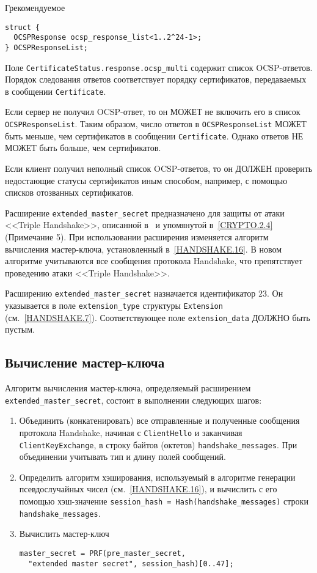 \begin{appendix}{Г}{рекомендуемое}
\begin{lstlisting}
struct {
  OCSPResponse ocsp_response_list<1..2^24-1>;
} OCSPResponseList;
\end{lstlisting}

Поле \lstinline{CertificateStatus.response.ocsp_multi} содержит список
OCSP-ответов. Порядок следования ответов соответствует порядку сертификатов,
передаваемых в сообщении \lstinline{Certificate}.

Если сервер не получил OCSP-ответ, то он МОЖЕТ не включить его в 
список \lstinline{OCSPResponseList}. Таким образом, число ответов в  
\lstinline{OCSPResponseList} МОЖЕТ быть меньше, чем сертификатов в сообщении 
\lstinline{Certificate}. Однако ответов НЕ МОЖЕТ быть больше, чем сертификатов.

Если клиент получил неполный список OCSP-ответов, то он ДОЛЖЕН проверить 
недостающие статусы сертификатов иным способом, например, с помощью списков 
отозванных сертификатов.  


Расширение \lstinline{extended_master_secret} предназначено для защиты от атаки 
<<Triple Handshake>>, описанной в~\cite{TripleHandshake} и упомянутой 
в~\ref{CRYPTO.2.4} (Примечание 5). При использовании расширения изменяется 
алгоритм вычисления мастер-ключа, установленный в~\ref{HANDSHAKE.16}. В новом 
алгоритме учитываются все сообщения протокола Handshake, что препятствует 
проведению атаки <<Triple Handshake>>.

Расширению \lstinline{extended_master_secret} назначается идентификатор 23. Он
указывается в поле \lstinline{extension_type} структуры \lstinline{Extension} 
(см.~\ref{HANDSHAKE.7}). Соответствующее поле \lstinline{extension_data} ДОЛЖНО 
быть пустым.

\subsection{Вычисление мастер-ключа}

Алгоритм вычисления мастер-ключа, определяемый расширением 
\lstinline{extended_master_secret}, состоит в выполнении следующих шагов:
\begin{enumerate}
\item
Объединить (конкатенировать) все отправленные и полученные сообщения протокола
Handshake, начиная с \lstinline{ClientHello} и заканчивая
\lstinline{ClientKeyExchange}, в строку байтов (октетов)
\lstinline{handshake_messages}. При объединении учитывать тип и длину полей
сообщений.
\item
Определить алгоритм хэширования, используемый в алгоритме генерации 
псевдослучайных чисел (см.~\ref{HANDSHAKE.16}), и вычислить с его помощью 
хэш-значение \lstinline{session_hash = Hash(handshake_messages)}
строки \lstinline{handshake_messages}.
\item
Вычислить мастер-ключ
\begin{lstlisting}
master_secret = PRF(pre_master_secret, 
  "extended master secret", session_hash)[0..47];
\end{lstlisting}
\end{enumerate}


\end{appendix}
